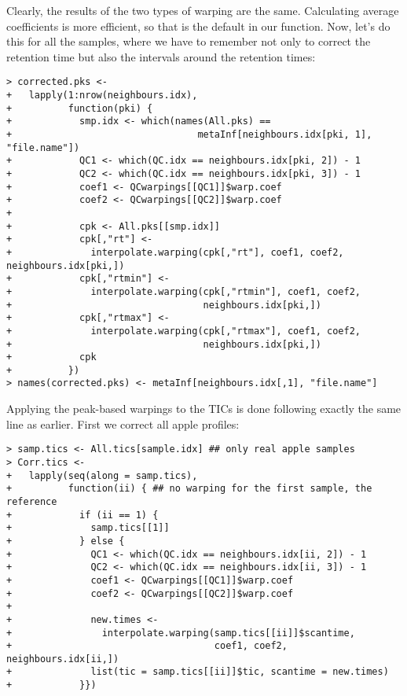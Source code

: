 \documentclass[a4paper,11pt]{article}\usepackage[]{graphicx}\usepackage[]{color}
\makeatletter
\newenvironment{kframe}{%
 \def\at@end@of@kframe{}%
 \ifinner\ifhmode%
  \def\at@end@of@kframe{\end{minipage}}%
  \begin{minipage}{\columnwidth}%
 \fi\fi%
 \def\FrameCommand##1{\hskip\@totalleftmargin \hskip-\fboxsep
 \colorbox{shadecolor}{##1}\hskip-\fboxsep
     \hskip-\linewidth \hskip-\@totalleftmargin \hskip\columnwidth}%
 \MakeFramed {\advance\hsize-\width
   \@totalleftmargin\z@ \linewidth\hsize
   \@setminipage}}%
 {\par\unskip\endMakeFramed%
 \at@end@of@kframe}
\newenvironment{knitrout}{}{} %
\makeatother
\begin{document}
\noindent
Clearly, the results of the two types of warping are the
same. Calculating average coefficients is more efficient, so that is
the default in our function. Now, let's do this for all the samples,
where we have to remember not only to correct the retention time but
also the intervals around the retention times:

\begin{knitrout}\small
{}\color{fgcolor}\begin{kframe}
\begin{verbatim}
> corrected.pks <- 
+   lapply(1:nrow(neighbours.idx),
+          function(pki) {
+            smp.idx <- which(names(All.pks) == 
+                                 metaInf[neighbours.idx[pki, 1], "file.name"])
+            QC1 <- which(QC.idx == neighbours.idx[pki, 2]) - 1
+            QC2 <- which(QC.idx == neighbours.idx[pki, 3]) - 1
+            coef1 <- QCwarpings[[QC1]]$warp.coef
+            coef2 <- QCwarpings[[QC2]]$warp.coef
+            
+            cpk <- All.pks[[smp.idx]]
+            cpk[,"rt"] <-
+              interpolate.warping(cpk[,"rt"], coef1, coef2, neighbours.idx[pki,])
+            cpk[,"rtmin"] <-
+              interpolate.warping(cpk[,"rtmin"], coef1, coef2,
+                                  neighbours.idx[pki,])
+            cpk[,"rtmax"] <-
+              interpolate.warping(cpk[,"rtmax"], coef1, coef2,
+                                  neighbours.idx[pki,])
+            cpk
+          })
> names(corrected.pks) <- metaInf[neighbours.idx[,1], "file.name"]
\end{verbatim}
\end{kframe}
\end{knitrout}

\noindent
Applying the peak-based warpings to the TICs is done following exactly
the same line as earlier. First we correct all apple profiles:

\begin{knitrout}\small
{}\color{fgcolor}\begin{kframe}
\begin{verbatim}
> samp.tics <- All.tics[sample.idx] ## only real apple samples
> Corr.tics <- 
+   lapply(seq(along = samp.tics),
+          function(ii) { ## no warping for the first sample, the reference
+            if (ii == 1) {
+              samp.tics[[1]] 
+            } else {
+              QC1 <- which(QC.idx == neighbours.idx[ii, 2]) - 1
+              QC2 <- which(QC.idx == neighbours.idx[ii, 3]) - 1
+              coef1 <- QCwarpings[[QC1]]$warp.coef
+              coef2 <- QCwarpings[[QC2]]$warp.coef
+              
+              new.times <-
+                interpolate.warping(samp.tics[[ii]]$scantime, 
+                                    coef1, coef2, neighbours.idx[ii,])
+              list(tic = samp.tics[[ii]]$tic, scantime = new.times)
+            }})
\end{verbatim}
\end{kframe}
\end{knitrout}
\end{document}
